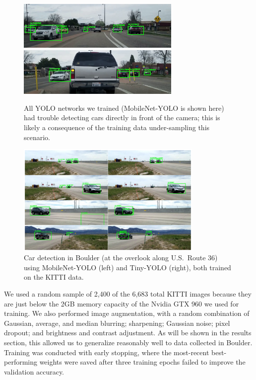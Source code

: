 \documentclass{article}
\begin{document}
\begin{figure}[p]
  \centering
  \includegraphics[width=0.7\textwidth]{fail_detect}
  \includegraphics[width=0.7\textwidth]{fail_detect2}
  \caption{All YOLO networks we trained (MobileNet-YOLO is shown here) had trouble detecting cars directly in front of the camera; this is likely a consequence of the training data under-sampling this scenario.}
  \label{fig:detection_fails}
\end{figure}

\begin{figure}[p]
  \centering
  \includegraphics[width=0.8\textwidth]{boulder_results}
  \caption{Car detection in Boulder (at the overlook along U.S.\ Route 36) using MobileNet-YOLO (left) and Tiny-YOLO (right), both trained on the KITTI data.}
  \label{fig:boulder_results}
\end{figure}

We used a random sample of 2,400 of the 6,683 total KITTI images because they are just below the 2GB memory capacity of the Nvidia GTX 960 we used for training. We also performed image augmentation, with a random combination of Gaussian, average, and median blurring; sharpening; Gaussian noise; pixel dropout; and brightness and contrast adjustment. As will be shown in the results section, this allowed us to generalize reasonably well to data collected in Boulder. Training was conducted with early stopping, where the most-recent best-performing weights were saved after three training epochs failed to improve the validation accuracy.
\end{document}
